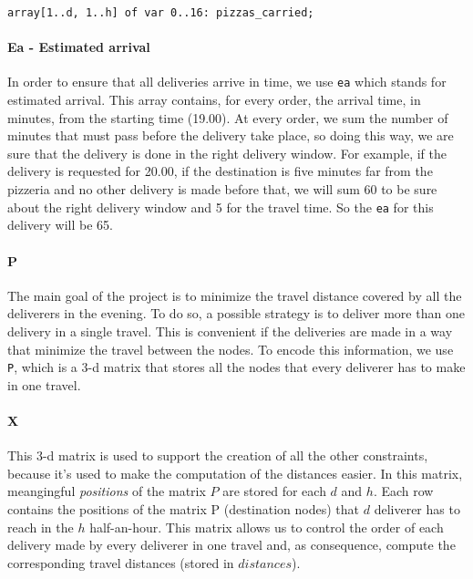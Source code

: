 \documentclass[10pt]{article}
\begin{document}
	\begin{center}
		\texttt{array[1..d, 1..h] of var 0..16: pizzas\_carried;}
	\end{center}

	\paragraph*{Ea - Estimated arrival}
	In order to ensure that all deliveries arrive in time, we use \texttt{ea} which
	stands for estimated arrival. This array contains, for every order, the arrival 
	time, in minutes, from the starting time (19.00). At every order, we sum the number 
	of minutes that must pass before the delivery take place, so doing this way,
	we are sure that the delivery is done in the right delivery window.
	For example, if the delivery is requested for 20.00, if the destination is five minutes 
	far from the pizzeria and no other delivery is made before that, we will sum 60 to 
	be sure about the right delivery window and 5 for the travel time. So the \texttt{ea}
	for this delivery will be 65.

	\paragraph*{P} The main goal of the project is to minimize the travel distance 
	covered by all the deliverers in the evening. To do so, a possible strategy
	is to deliver more than one delivery in a single travel. This is convenient 
	if the deliveries are made in a way that minimize the travel between the nodes.
	To encode this information, we use \texttt{P}, which is a 3-d matrix that stores
	all the nodes that every deliverer has to make in one travel. 
	
	\paragraph*{X} This 3-d matrix is used to support the creation of all the other 
	constraints, because it's used to make the computation of the distances easier.
	In this matrix, meangingful \textit{positions} of the matrix $P$ are stored for each 
	$d$ and $h$. Each row contains the positions of the matrix P (destination nodes) 
	that $d$ deliverer has to reach in the $h$ half-an-hour. This matrix allows us to control the order of each delivery made by every deliverer in one travel and, as consequence, compute the corresponding travel distances (stored in $distances$).
\end{document}
